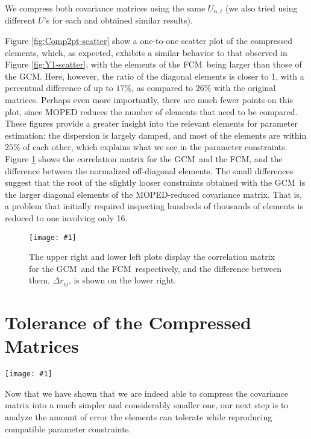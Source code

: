 \documentclass[twocolumn,nofootinbib]{\docclass}
\newcommand{\sfig}[2]{
	\texttt{[image: \#1]}
}
\newcommand{\Sfig}[3]{
	\begin{figure}[#1]
		\sfig{../figures/#2.pdf}{\columnwidth}
		\caption{#3}
		\label{fig:#2}
	\end{figure}
}
\newcommand{\Swide}[3]{
	\begin{figure*}[#1]
		\sfig{../figures/#2.pdf}{\textwidth}
		\caption{#3}
		\label{fig:#2}
	\end{figure*}
}
\newcommand{\rf}[1]{Figure \ref{fig:#1}}
\newcommand\full{the FCM}
\newcommand\gaussian{the GCM}
\begin{document}
We compress both covariance matrices using the same $U_{\alpha, i}$ (we also tried using different $U$'s for each and obtained similar results).

\rf{Comp2pt-scatter} show a one-to-one scatter plot of the compressed elements, which, as expected, exhibits a similar behavior to that observed in \rf{Y1-scatter}, with the elements of \full\ being larger than those of \gaussian. Here, however, the ratio of the diagonal elements is closer to 1, with a percentual difference of up to $17\%$, as compared to $26\%$ with the original matrices. Perhaps even more importantly, there are much fewer points on this plot, since MOPED reduces the number of elements that need to be compared. These figures provide a greater insight into the relevant elements for parameter estimation: the dispersion is largely damped, and most of the elements are within $25\%$ of each other, which explains what we see in the parameter constraints. \rf{Comp2pt-correlation} shows the correlation matrix for \gaussian\ and \full, and the difference between the normalized off-diagonal elements. The small differences suggest that the root of the slightly looser constraints obtained with \gaussian\ is the larger diagonal elements of the MOPED-reduced covariance matrix. That is, a problem that initially required inspecting hundreds of thousands of elements is reduced to one involving only 16.

\Sfig{thbp}{Comp2pt-correlation}{The upper right and lower left plots display the correlation matrix for \gaussian\ and \full\ respectively, and the difference between them, $\Delta r_{ij}$, is shown on the lower right.}

\section{Tolerance of the Compressed Matrices}
\label{sec:tolerance}

\Swide{thbp}{Tolerance_constraints}{An error plot showing the changes to the constraints for $\Omega_m$, $S_8$ and $A_{\text{IA}}$ for errors added at $5\%, 10\%, 15\%, 25\%, 30\%, 35\%, 40\%$ and $45\%$ of the original elements (in purple) and eigenvalues (in green) of the compressed covariance matrix. The blue rectangle covers the 68\% CL interval obtained for \full, and the darker blue vertical line shows the mean value for the respective parameter.}

Now that we have shown that we are indeed able to compress the covariance matrix into a much simpler and considerably smaller one, our next step is to analyze the amount of error the elements can tolerate while reproducing compatible parameter constraints.
\end{document}
